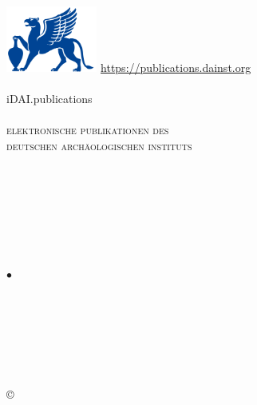 \documentclass[fontsize=9pt,english,ngerman]{scrartcl}
\def\issnonlinetag{\issntagonline \mysep \eng{\issntagonline} \mybf{\issnonline}\\}
\def\inputcmd{\clearpage}
\begin{document}
\begin{flushright}
\includegraphics[width=3cm]{dailogo}\hspace*{1.9cm}%
{\tiny\href{https://publications.dainst.org}{https://publications.dainst.org}}\\[-.2em]
\myrule\\[.5em]
{\fontsize{30}{10}\selectfont iDAI.publications}\\
\myrule\\[.5em]
{\scshape elektronische publikationen des\\ deutschen archäologischen instituts}
\end{flushright}
\RaggedRight
\vspace*{4em}
\entry{\digitaloffprint}{}\\[1em]
{\huge\artauthor\\[.5em]
\mybf{\arttitle}}\\[6em]

\entry{\from}{}

{\huge\mybf{\journal}\\
\journalsubtitle\\[3em]}

\entry{\issuetag}{\issue} {$\bullet$} \mybf{\yearpub}\hfill\purl\\
\entry{\pagestag}{\pages}\hfill\urn\\[1em]
\vfill
\begin{footnotesize}
\entry{\editortag}{\editor}\\
\entry{\journalurltag}{\journalurl}\\
\entry{\issntag}{\issn}\\
\issnonlinetag
\entry{\publishertag}{\publisher}\\[1em]

\copyright\,\the\year{} \copyrightdai\\[1em]
\terms\\[1em]
\eng{\terms}\\
\end{footnotesize}\inputcmd
\end{document}
